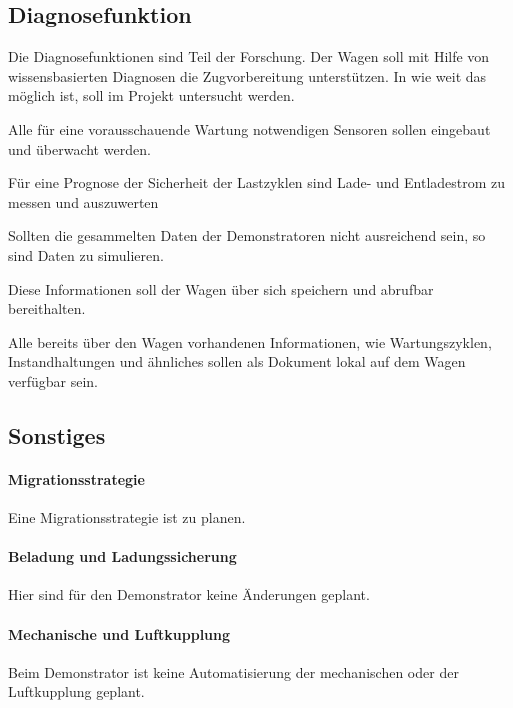 \subsection{Diagnosefunktion}
Die Diagnosefunktionen sind Teil der Forschung. Der Wagen soll mit Hilfe von wissensbasierten Diagnosen die Zugvorbereitung unterstützen. In wie weit das möglich ist, soll im Projekt untersucht werden. 
\begin{feat}
Alle für eine vorausschauende Wartung notwendigen Sensoren sollen eingebaut und überwacht werden.
\end{feat}
\begin{feat}
Für eine Prognose der Sicherheit der Lastzyklen sind Lade- und Entladestrom zu messen und auszuwerten
\end{feat}
\begin{rem}
Sollten die gesammelten Daten der \gls{Demonstrator}en nicht ausreichend sein, so sind Daten zu simulieren.
\end{rem}
\begin{feat}
Diese Informationen soll der Wagen über sich speichern und abrufbar bereithalten.
\end{feat}
\begin{feat}
Alle bereits über den Wagen vorhandenen Informationen, wie Wartungszyklen, Instandhaltungen und ähnliches sollen als Dokument lokal auf dem Wagen  verfügbar sein.
\end{feat}

\subsection{Sonstiges}
\paragraph{Migrationsstrategie}
\begin{feat}
Eine Migrationsstrategie ist zu planen.
\end{feat}
\paragraph{Beladung und Ladungssicherung}
Hier sind für den \gls{Demonstrator} keine Änderungen geplant.
\paragraph{Mechanische und Luftkupplung}
Beim \gls{Demonstrator} ist keine Automatisierung der mechanischen oder der Luftkupplung geplant.
